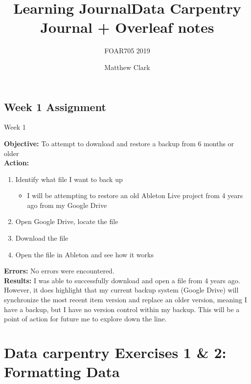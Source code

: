 \documentclass{article}
\title{Learning Journal}
\subtitle{FOAR705 2019}
\author{Matthew Clark}
\date{\vspace{-5ex}} %
\begin{document}
\maketitle
\newpage
\tableofcontents
\newpage
\title{Data Carpentry Journal + Overleaf notes}
\maketitle
\newpage
\begin{center}
\section{Week 1 Assignment}
Week 1
\end{center}
\noindent
\textbf{Objective:} To attempt to download and restore a backup from 6 months or older\\
\textbf{Action:}
\begin{enumerate}
    \item Identify what file I want to back up
    \begin{itemize}
        \item I will be attempting to restore an old Ableton Live project from 4 years ago from my Google Drive
    \end{itemize}
    \item Open Google Drive, locate the file
    \item Download the file
    \item Open the file in Ableton and see how it works
\end{enumerate}
\textbf{Errors:} No errors were encountered. \\
\textbf{Results:} I was able to successfully download and open a file from 4 years ago. However, it does highlight that my current backup system (Google Drive) will synchronize the most recent item version and replace an older version, meaning I have a backup, but I have no version control within my backup. This will be a point of action for future me to explore down the line.
\newpage
\section{Data carpentry Exercises 1 \& 2: Formatting Data}
\end{document}
